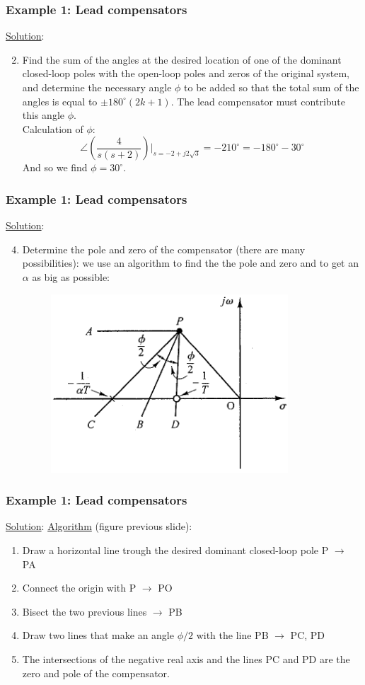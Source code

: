 \begin{frame}
	\frametitle{Example 1: Lead compensators}
	\underline{Solution}:
	\begin{enumerate}
		\setcounter{enumi}{1}
		\item  Find the sum of the angles at the desired location of one of the dominant closed-loop poles with the open-loop poles and zeros of the original system, and determine the necessary angle $\phi$ to be added so that the total sum of the angles is equal to $\pm 180^{\circ}(2k + 1)$. The lead compensator must contribute this angle $\phi$.\\
		Calculation of $\phi$: $$\angle(\frac{4}{s(s+2)})|_{s=-2+j2\sqrt{3}}=-210^{\circ}=-180^{\circ}-30^{\circ}$$
		And so we find $\phi=30^{\circ}$.
	\end{enumerate}
\end{frame}

\begin{frame}
	\frametitle{Example 1: Lead compensators}
	\underline{Solution}:
	\begin{enumerate}
		\setcounter{enumi}{3}
		\item Determine the pole and zero of the compensator (there are many possibilities): we use an algorithm to find the the pole and zero and to get an $\alpha$ as big as possible:
		\begin{figure}
			\centering
			\includegraphics[width=0.6\linewidth]{Ex1_draw_algoritme}
		\end{figure}
	\end{enumerate}
\end{frame}

\begin{frame}
	\frametitle{Example 1: Lead compensators}
	\underline{Solution}:
	\underline{Algorithm} (figure previous slide):
	\begin{enumerate}
		\item Draw a horizontal line trough the desired dominant closed-loop pole P $\rightarrow$ PA
		\item Connect the origin with P $\rightarrow$ PO
		\item Bisect the two previous lines $\rightarrow$ PB
		\item Draw two lines that make an angle $\phi/2$ with the line PB $\rightarrow$ PC, PD
		\item The intersections of the negative real axis and the lines PC and PD are the zero and pole of the compensator. 
	\end{enumerate}
\end{frame}

